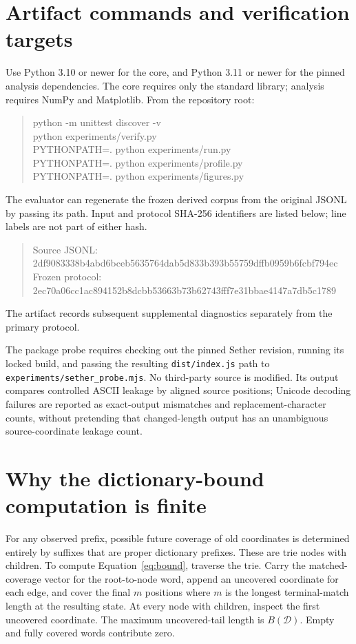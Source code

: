 \documentclass[11pt,a4paper]{article}
\newcommand{\D}{\mathcal{D}}
\begin{document}
\appendix
\section{Artifact commands and verification targets}
Use Python 3.10 or newer for the core, and Python 3.11 or newer for the pinned analysis dependencies. The core requires only the standard library; analysis requires NumPy and Matplotlib. From the repository root:
\begin{quote}\small\ttfamily
python -m unittest discover -v\\
python experiments/verify.py\\
PYTHONPATH=. python experiments/run.py\\
PYTHONPATH=. python experiments/profile.py\\
PYTHONPATH=. python experiments/figures.py
\end{quote}
The evaluator can regenerate the frozen derived corpus from the original JSONL by passing its path. Input and protocol SHA-256 identifiers are listed below; line labels are not part of either hash.
\begin{quote}\footnotesize\ttfamily
Source JSONL:\\
2df9083338b4abd6bceb5635764dab5d833b393b55759dffb0959b6fcbf794ec\\
Frozen protocol:\\
2ec70a06cc1ac894152b8dcbb53663b73b62743fff7e31bbae4147a7db5c1789
\end{quote}
The artifact records subsequent supplemental diagnostics separately from the primary protocol.

The package probe requires checking out the pinned Sether revision, running its locked build, and passing the resulting \texttt{dist/index.js} path to \texttt{experiments/sether\_probe.mjs}. No third-party source is modified. Its output compares controlled ASCII leakage by aligned source positions; Unicode decoding failures are reported as exact-output mismatches and replacement-character counts, without pretending that changed-length output has an unambiguous source-coordinate leakage count.

\section{Why the dictionary-bound computation is finite}
For any observed prefix, possible future coverage of old coordinates is determined entirely by suffixes that are proper dictionary prefixes. These are trie nodes with children. To compute Equation~\eqref{eq:bound}, traverse the trie. Carry the matched-coverage vector for the root-to-node word, append an uncovered coordinate for each edge, and cover the final $m$ positions where $m$ is the longest terminal-match length at the resulting state. At every node with children, inspect the first uncovered coordinate. The maximum uncovered-tail length is $B(\D)$. Empty and fully covered words contribute zero.
\end{document}
